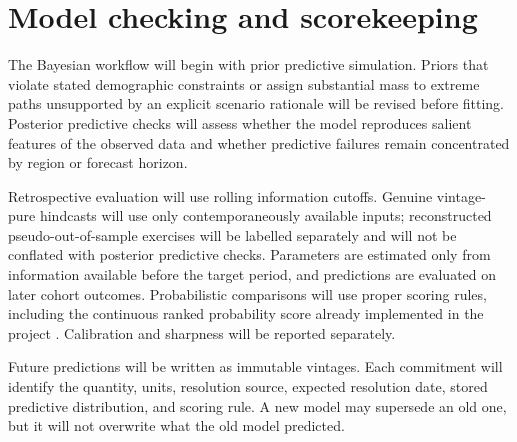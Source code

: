 \section{Model checking and scorekeeping}

The Bayesian workflow will begin with prior predictive simulation. Priors that
violate stated demographic constraints or assign substantial mass to extreme
paths unsupported by an explicit scenario rationale will be revised before
fitting. Posterior predictive checks will assess whether the model reproduces
salient features of the observed data and whether predictive failures remain
concentrated by region or forecast horizon.

Retrospective evaluation will use rolling information cutoffs. Genuine
vintage-pure hindcasts will use only contemporaneously available inputs;
reconstructed pseudo-out-of-sample exercises will be labelled separately and
will not be conflated with posterior predictive checks. Parameters are
estimated only from information available before the target period, and
predictions are evaluated on later cohort outcomes. Probabilistic comparisons
will use proper scoring rules, including the continuous ranked probability
score already implemented in the project
\citep{gneiting2007}. Calibration and sharpness will be reported separately.

Future predictions will be written as immutable vintages. Each commitment will
identify the quantity, units, resolution source, expected resolution date,
stored predictive distribution, and scoring rule. A new model may supersede an
old one, but it will not overwrite what the old model predicted.

